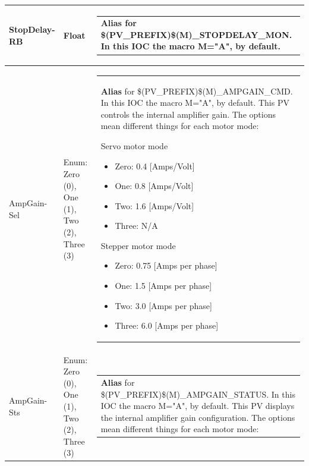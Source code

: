 \documentclass[openany]{article}
\begin{document}
\begin{longtable}{| m{4.5cm} m{2.5cm}  m{8.5cm} |}
        StopDelay-RB & Float & \begin{tabular}{@{}m{6cm}@{}}
                \textbf{\color{blue} Alias} for \$(PV\_PREFIX)\$(M)\_STOPDELAY\_MON. In this IOC the macro M="A", by default.
            \end{tabular} \hypertarget{pv:amp-gain}{}\\ \hline
        AmpGain-Sel & Enum: Zero (0), One (1), Two (2), Three (3) & \begin{tabular}{@{}m{6cm}@{}}
                \textbf{\color{blue} Alias} for \$(PV\_PREFIX)\$(M)\_AMPGAIN\_CMD. In this IOC the macro M="A", by default. This PV controls the internal amplifier gain. The options mean different things for each motor mode:

                Servo motor mode
                \begin{itemize}
                    \item Zero: 0.4 [Amps/Volt]
                    \item One: 0.8 [Amps/Volt]
                    \item Two: 1.6 [Amps/Volt]
                    \item Three: N/A
                \end{itemize}
                Stepper motor mode
                \begin{itemize}
                    \item Zero: 0.75 [Amps per phase]
                    \item One: 1.5 [Amps per phase]
                    \item Two: 3.0 [Amps per phase]
                    \item Three: 6.0 [Amps per phase]
                \end{itemize}
            \end{tabular} \hypertarget{}{}\\ \hline
        AmpGain-Sts & Enum: Zero (0), One (1), Two (2), Three (3) & \begin{tabular}{@{}m{6cm}@{}}
                \textbf{\color{blue} Alias} for \$(PV\_PREFIX)\$(M)\_AMPGAIN\_STATUS. In this IOC the macro M="A", by default. This PV displays the internal amplifier gain configuration. The options mean different things for each motor mode:


\end{tabular}
\end{longtable}
\end{document}
